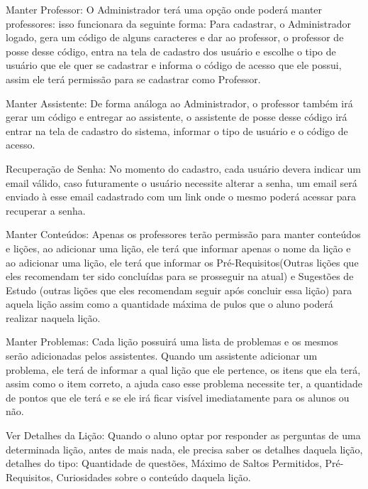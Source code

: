 \begin{alineascomponto}
	\item Manter Professor: O Administrador terá uma opção onde poderá manter 
professores: isso funcionara da seguinte forma: Para cadastrar, o Administrador 
logado, gera um código de alguns caracteres e dar ao professor, o professor de 
posse desse código, entra na tela de cadastro dos usuário e escolhe o tipo de 
usuário que ele quer se cadastrar e informa o código de acesso que ele possui, 
assim ele terá permissão para se cadastrar como Professor.

	\item Manter Assistente: De forma análoga ao Administrador, o professor 
também irá gerar um código e entregar ao assistente, o assistente de posse 
desse código irá entrar na tela de cadastro do sistema, informar o tipo de 
usuário e o código de acesso.

	\item Recuperação de Senha: No momento do cadastro, cada usuário devera 
indicar um email v\'alido, caso futuramente o usuário necessite 
alterar a senha, um email será enviado à esse email cadastrado com um link onde 
o mesmo poder\'a acessar para recuperar a senha.

	\item Manter Conte\'udos: Apenas os professores terão permissão para manter 
conte\'udos e lições, ao adicionar uma lição, ele terá que informar apenas o 
nome da lição e ao adicionar uma lição, ele terá que informar os 
Pré-Requisitos(Outras lições que eles recomendam ter sido concluídas para se 
prosseguir na atual) e Sugestões de Estudo (outras lições que eles recomendam 
seguir após concluir essa lição) para aquela lição assim como a quantidade 
máxima de pulos que o aluno poderá realizar naquela lição.

	\item Manter Problemas: Cada lição possuirá uma lista de problemas e os 
mesmos serão adicionadas pelos assistentes. Quando um assistente adicionar 
um problema, ele terá de informar a qual lição que ele pertence, os itens que 
ela terá, assim como o item correto, a ajuda caso esse problema necessite ter, 
a quantidade de pontos que ele terá e se ele irá ficar visível imediatamente 
para os alunos ou não.

	\item Ver Detalhes da Lição: Quando o aluno optar por responder as perguntas 
de uma determinada lição, antes de mais nada, ele precisa saber os detalhes 
daquela lição, detalhes do tipo: Quantidade de questões, Máximo de Saltos 
Permitidos, Pré-Requisitos, Curiosidades sobre o conteúdo daquela lição.


\end{alineascomponto}
